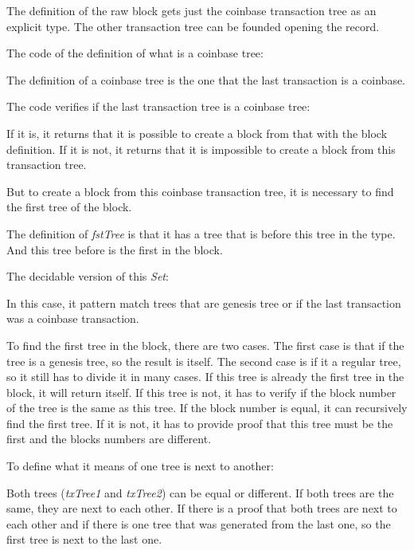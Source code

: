 
The definition of the raw block gets just the coinbase transaction tree as an explicit type.
The other transaction tree can be founded opening the record.


The code of the definition of what is a coinbase tree:


The definition of a coinbase tree is the one that the last transaction is a coinbase.

The code verifies if the last transaction tree is a coinbase tree:


If it is, it returns that it is possible to create a block from that with the block definition.
If it is not, it returns that it is impossible to create a block from this transaction tree.

But to create a block from this coinbase transaction tree, it is necessary to find the first tree
of the block.


The definition of \emph{fstTree} is that it has a tree that is before this tree in the type.
And this tree before is the first in the block.


The decidable version of this \emph{Set}:


In this case, it pattern match trees that are genesis tree or if the last transaction was a coinbase
transaction.


To find the first tree in the block, there are two cases.
The first case is that if the tree is a genesis tree, so the result is itself.
The second case is if it a regular tree, so it still has to divide it in many cases.
If this tree is already the first tree in the block, it will return itself.
If this tree is not, it has to verify if the block number of the tree is the same as this tree.
If the block number is equal, it can recursively find the first tree.
If it is not, it has to provide proof that this tree must be
the first and the blocks numbers are different.

To define what it means of one tree is next to another:


Both trees (\emph{txTree1} and \emph{txTree2}) can be equal or different.
If both trees are the same, they are next to each other.
If there is a proof that both trees are next to each other and
if there is one tree that was generated from the last one,
so the first tree is next to the last one.
